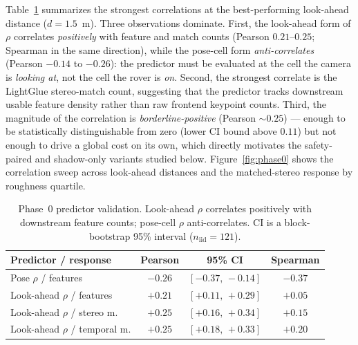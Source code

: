 \documentclass[letterpaper,times]{IONconf}
\begin{document}
Table~\ref{tab:phase0} summarizes the strongest correlations at the best-performing look-ahead distance ($d = 1.5$~m). Three observations dominate. First, the look-ahead form of $\rho$ correlates \emph{positively} with feature and match counts (Pearson $0.21$--$0.25$; Spearman in the same direction), while the pose-cell form \emph{anti-correlates} (Pearson $-0.14$ to $-0.26$): the predictor must be evaluated at the cell the camera is \emph{looking at}, not the cell the rover is \emph{on}. Second, the strongest correlate is the LightGlue stereo-match count, suggesting that the predictor tracks downstream usable feature density rather than raw frontend keypoint counts. Third, the magnitude of the correlation is \emph{borderline-positive} (Pearson $\sim 0.25$) --- enough to be statistically distinguishable from zero (lower CI bound above $0.11$) but not enough to drive a global cost on its own, which directly motivates the safety-paired and shadow-only variants studied below. Figure~\ref{fig:phase0} shows the correlation sweep across look-ahead distances and the matched-stereo response by roughness quartile.

\begin{table}[t]
\renewcommand{\arraystretch}{1.15}
\caption{Phase~0 predictor validation. Look-ahead $\rho$ correlates positively with downstream feature counts; pose-cell $\rho$ anti-correlates. CI is a block-bootstrap 95\% interval ($n_{\text{iid}} = 121$).}
\label{tab:phase0}
\centering
\small
\setlength{\tabcolsep}{4pt}
\begin{tabular}{lccc}
\toprule
Predictor / response   & Pearson & 95\% CI            & Spearman \\
\midrule
Pose $\rho$ / features          & $-0.26$ & $[-0.37,\,-0.14]$ & $-0.37$ \\
Look-ahead $\rho$ / features    & $+0.21$ & $[+0.11,\,+0.29]$ & $+0.05$ \\
Look-ahead $\rho$ / stereo m.   & $\mathbf{+0.25}$ & $[+0.16,\,+0.34]$ & $+0.15$ \\
Look-ahead $\rho$ / temporal m. & $+0.25$ & $[+0.18,\,+0.33]$ & $+0.20$ \\
\bottomrule
\end{tabular}
\end{table}
\end{document}
